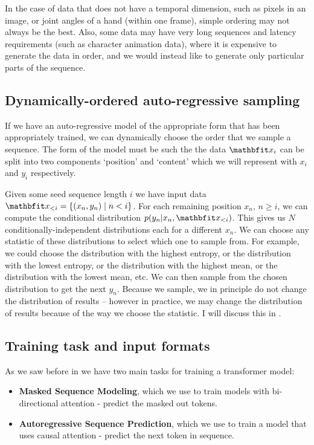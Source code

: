 In the case of data that does not have a temporal dimension, such as pixels in an image, or joint angles of a hand (within one frame), simple ordering may not always be the best. Also, some data may have very long sequences and latency requirements (such as character animation data), where it is expensive to generate the data in order, and we would instead like to generate only particular parts of the sequence.

\subsection{Dynamically-ordered auto-regressive sampling}

If we have an auto-regressive model of the appropriate form that has been appropriately trained, we can dynamically choose the order that we sample a sequence. The form of the model must be such the the data $\x_i$ can be split into two components `position' and `content' which we will represent with $x_i$ and $y_i$ respectively.

Given some seed sequence length $i$ we have input data $\x_{<i} = \{ (x_n, y_n) \mid n < i \}$. For each remaining position $x_n$, $n ≥ i$, we can compute the conditional distribution $p(y_n | x_n,  \x_{<i})$. This gives us $N$ conditionally-independent distributions each for a different $x_n$. We can choose any statistic of these distributions to select which one to sample from. For example, we could choose the distribution with the highest entropy, or the distribution with the lowest entropy, or the distribution with the highest mean, or the distribution with the lowest mean, etc. We can then sample from the chosen distribution to get the next $y_n$. Because we sample, we in principle do not change the distribution of results -- however in practice, we may change the distribution of results because of the way we choose the statistic. I will discuss this in .


\subsection{Training task and input formats}
\label{ss:transformer-inputs}

As we saw before in  we have two main tasks for training a transformer model:

\begin{itemize}
    \item \textbf{Masked Sequence Modeling}, which we use to train models with bi-directional attention - predict the masked out tokens.
    \item \textbf{Autoregressive Sequence Prediction}, which we use to train a model that uses causal attention - predict the next token in sequence.
\end{itemize}


